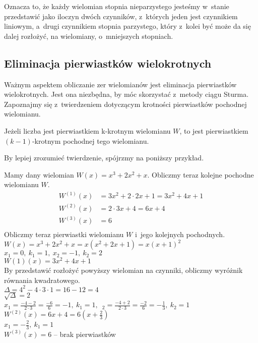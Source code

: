 Oznacza to, że każdy wielomian stopnia nieparzystego jesteśmy w~stanie przedstawić jako iloczyn dwóch czynników, z~których jeden jest czynnikiem liniowym, a~drugi czynnikiem stopnia parzystego, który z~kolei być może da się dalej rozłożyć, na wielomiany, o~mniejszych stopniach.

\subsection{Eliminacja pierwiastków wielokrotnych}

Ważnym aspektem obliczanie zer wielomianów jest eliminacja pierwiastków wielokrotnych. Jest ona niezbędna, by móc skorzystać z~metody ciągu Sturma. Zapoznajmy się z~twierdzeniem dotyczącym krotności pierwiastków pochodnej wielomianu.

\begin{theorem}
	$ $\\
	Jeżeli liczba jest pierwiastkiem k-krotnym wielomianu $W$, to jest pierwiastkiem $(k-1)$-krotnym pochodnej tego wielomianu.
\end{theorem}

By lepiej zrozumieć twierdzenie, spójrzmy na poniższy przykład.

\begin{example}
	$ $\\
	Mamy dany wielomian $W(x) = x^3 + 2x^2 + x$. Obliczmy teraz kolejne pochodne wielomianu $W$. \\
	\begin{equation*}
	\begin{split}
		W^{(1)}(x) &= 3x^2 + 2 \cdot 2x + 1 = 3x^2 + 4x + 1 \\
		W^{(2)}(x) &= 2 \cdot 3x + 4 = 6x + 4 \\
		W^{(3)}(x) &= 6 \\
	\end{split}
	\end{equation*}
	Obliczmy teraz pierwiastki wielomianu $W$ i~jego kolejnych pochodnych. \\
	$W(x) = x^3 + 2x^2 + x = x(x^2 + 2x +1) = x(x + 1)^2$ \\
	$x_1 = 0,\ k_1 = 1,\ x_2 = -1,\ k_2 = 2$ \\
	$W{(1)}(x) = 3x^2 + 4x + 1$ \\
	By przedstawić rozłożyć powyższy wielomian na czynniki, obliczmy wyróżnik równania kwadratowego.\\
	$\Delta = 4^2 - 4 \cdot 3 \cdot 1 = 16 - 12 = 4$ \\
	$\sqrt{\Delta} = 2$ \\
	$x_1 = \frac{-4-2}{2 \cdot 3} = \frac{-6}{6} = -1,\ k_1 = 1,$\ $_2 = \frac{-4+2}{2 \cdot 3} = \frac{-2}{6} = -\frac{1}{3},\ k_2 = 1$ \\
	$W^{(2)}(x) = 6x + 4 = 6 (x + \frac{2}{3})$ \\
	$x_1 = -\frac{2}{3},\ k_1 = 1$ \\
	$W^{(3)}(x) = 6$ -- brak pierwiastków
\end{example}


